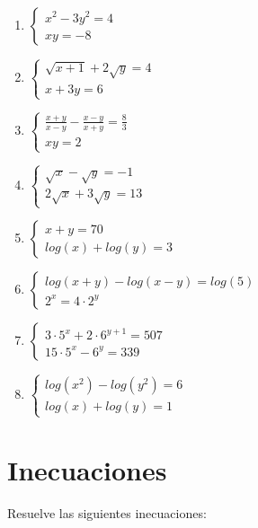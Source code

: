 \begin{enumerate}[topsep=0pt]
	\item $ \begin{cases}
		x^2 - 3y^2 = 4 \\
		xy = -8
	\end{cases}  $
	\item $ \begin{cases}
		\sqrt{x+1} + 2\sqrt{y} = 4 \\
		x+3y=6
	\end{cases}  $
	\item $ \begin{cases}
		\frac{x+y}{x-y} -\frac{x-y}{x+y} = \frac{8}{3} \\
		xy = 2
	\end{cases}  $
	\item $ \begin{cases}
		\sqrt{x} - \sqrt{y} = -1 \\
		2\sqrt{x} + 3\sqrt{y} = 13
	\end{cases}  $
	\item $ \begin{cases}
		x+y = 70 \\
		log(x) + log(y) = 3
	\end{cases}  $
	\item $ \begin{cases}
		log(x+y) - log(x-y) = log(5) \\
		2^x = 4 \cdot 2^y
	\end{cases}  $
	\item $ \begin{cases}
		3 \cdot 5^x + 2 \cdot 6^{y+1} = 507\\
		15 \cdot 5^x - 6 ^y = 339
	\end{cases}  $
	\item $ \begin{cases}
		log(x^2) - log(y^2) = 6 \\
		log(x) + log(y) = 1
	\end{cases}  $
\end{enumerate}

\section{Inecuaciones}

\Exercicio Resuelve las siguientes inecuaciones:

